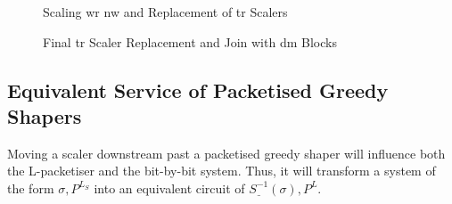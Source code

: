 \begin{figure}[H]
  \centering
  \def\svgwidth{0.95\textheight}
   \vspace*{-10mm}
 \hspace*{-10mm}
  \caption{Scaling \gls{wr} \gls{nw} and Replacement of \gls{tr} Scalers}
  \label{fig:block4}
\end{figure}

\begin{figure}[H]
  \centering
  \def\svgwidth{0.95\textheight}
  \vspace*{-10mm}
 \hspace*{-10mm}
  \caption{Final \gls{tr} Scaler Replacement and Join with \gls{dm} Blocks}
  \label{fig:block5}
\end{figure}

\subsection{Equivalent Service of Packetised Greedy Shapers}
Moving a scaler downstream past a packetised greedy shaper will influence both the L-packetiser and the bit-by-bit system. 
Thus, it will transform a system of the form $\sigma, P^{L_{S}}$ into an equivalent circuit of  $\underline{S^{-1}}(\sigma), P^{L}$.

